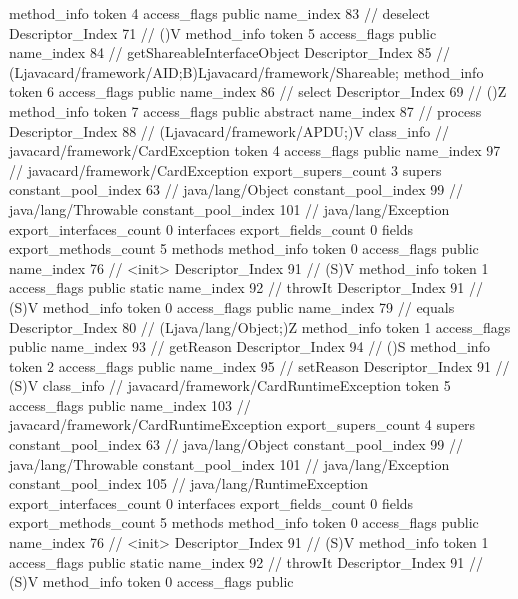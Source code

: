 {{{{{				}
				method_info {
					token	4
					access_flags	public
					name_index	83		// deselect
					Descriptor_Index	71		// ()V
				}
				method_info {
					token	5
					access_flags	public
					name_index	84		// getShareableInterfaceObject
					Descriptor_Index	85		// (Ljavacard/framework/AID;B)Ljavacard/framework/Shareable;
				}
				method_info {
					token	6
					access_flags	public
					name_index	86		// select
					Descriptor_Index	69		// ()Z
				}
				method_info {
					token	7
					access_flags	public abstract
					name_index	87		// process
					Descriptor_Index	88		// (Ljavacard/framework/APDU;)V
				}
			}
		}
		class_info {		// javacard/framework/CardException
			token	4
			access_flags	public
			name_index	97		// javacard/framework/CardException
			export_supers_count	3
			supers {
				constant_pool_index	63		// java/lang/Object
				constant_pool_index	99		// java/lang/Throwable
				constant_pool_index	101		// java/lang/Exception
			}
			export_interfaces_count	0
			interfaces {
			}
			export_fields_count	0
			fields {
			}
			export_methods_count	5
			methods {
				method_info {
					token	0
					access_flags	public
					name_index	76		// <init>
					Descriptor_Index	91		// (S)V
				}
				method_info {
					token	1
					access_flags	public static
					name_index	92		// throwIt
					Descriptor_Index	91		// (S)V
				}
				method_info {
					token	0
					access_flags	public
					name_index	79		// equals
					Descriptor_Index	80		// (Ljava/lang/Object;)Z
				}
				method_info {
					token	1
					access_flags	public
					name_index	93		// getReason
					Descriptor_Index	94		// ()S
				}
				method_info {
					token	2
					access_flags	public
					name_index	95		// setReason
					Descriptor_Index	91		// (S)V
				}
			}
		}
		class_info {		// javacard/framework/CardRuntimeException
			token	5
			access_flags	public
			name_index	103		// javacard/framework/CardRuntimeException
			export_supers_count	4
			supers {
				constant_pool_index	63		// java/lang/Object
				constant_pool_index	99		// java/lang/Throwable
				constant_pool_index	101		// java/lang/Exception
				constant_pool_index	105		// java/lang/RuntimeException
			}
			export_interfaces_count	0
			interfaces {
			}
			export_fields_count	0
			fields {
			}
			export_methods_count	5
			methods {
				method_info {
					token	0
					access_flags	public
					name_index	76		// <init>
					Descriptor_Index	91		// (S)V
				}
				method_info {
					token	1
					access_flags	public static
					name_index	92		// throwIt
					Descriptor_Index	91		// (S)V
				}
				method_info {
					token	0
					access_flags	public
}}}}}
